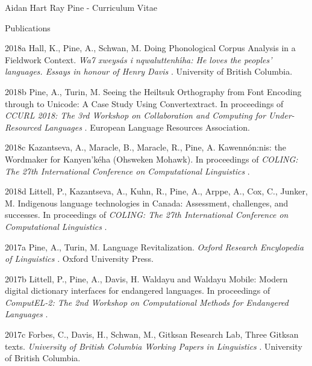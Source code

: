 \documentclass[12pt]{letter}
\begin{document}
\begin{cv}{ Aidan Hart Ray Pine  \space - \space   Curriculum Vitae}
\begin{cvlist}{Publications}
                                                                                                                                                                            \item[2018a]  Hall,  K.,  Pine,  A.,  Schwan,  M.  Doing Phonological Corpus Analysis in a Fieldwork Context. \textit{ Wa7 xweys{\'a}s i nqwaluttenh{\'\i}ha: He loves the peoples' languages. Essays in honour of Henry Davis }.  University of British Columbia.  
                                                                                \item[2018b] Pine, A., Turin, M.  Seeing the Heiltsuk Orthography from Font Encoding through to Unicode: A Case Study Using Convertextract. In proceedings of \textit{ CCURL 2018: The 3rd Workshop on Collaboration and Computing for Under-Resourced Languages }.  European Language Resources Association.  
                                                                                \item[2018c] Kazantseva, A., Maracle, B., Maracle, R., Pine, A.  Kawenn{\'o}n:nis: the Wordmaker for Kanyen'k{\'e}ha (Ohsweken Mohawk). In proceedings of \textit{ COLING: The 27th International Conference on Computational Linguistics }.  
                                                                                \item[2018d] Littell, P., Kazantseva, A., Kuhn, R., Pine, A., Arppe, A., Cox, C., Junker, M.  Indigenous language technologies in Canada: Assessment, challenges, and successes. In proceedings of \textit{ COLING: The 27th International Conference on Computational Linguistics }.  
                                                                                                            \item[2017a]  Pine,  A.,  Turin,  M.  Language Revitalization. \textit{ Oxford Research Encylopedia of Linguistics }.  Oxford University Press.  
                                                                                \item[2017b] Littell, P., Pine, A., Davis, H.  Waldayu and Waldayu Mobile: Modern digital dictionary interfaces for endangered languages. In proceedings of \textit{ ComputEL-2: The 2nd Workshop on Computational Methods for Endangered Languages }.  
                                                                                \item[2017c]  Forbes,  C.,  Davis,  H.,  Schwan,  M.,  Gitksan Research Lab,   Three Gitksan texts. \textit{ University of British Columbia Working Papers in Linguistics }.  University of British Columbia.  
                                                        \end{cvlist}


\end{cv}
\end{document}
